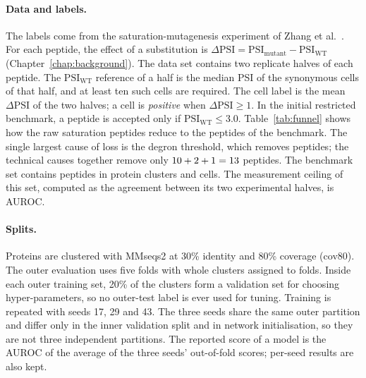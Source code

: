 \paragraph{Data and labels.}
The labels come from the saturation-mutagenesis experiment of Zhang et al.\ \citep{zhang2023,zhang2023data}.
For each peptide, the effect of a substitution is $\Delta\mathrm{PSI}=\mathrm{PSI}_{\mathrm{mutant}}-\mathrm{PSI}_{\mathrm{WT}}$
(Chapter~\ref{chap:background}). The data set contains two replicate halves of each peptide. The
$\mathrm{PSI}_{\mathrm{WT}}$ reference of a half is the median PSI of the synonymous cells of that half,
and at least ten such cells are required. The cell label is the mean $\Delta\mathrm{PSI}$ of the two halves;
a cell is \emph{positive} when $\Delta\mathrm{PSI}\ge 1$. In the initial restricted benchmark, a peptide is accepted only if
$\mathrm{PSI}_{\mathrm{WT}}\le 3.0$. Table~\ref{tab:funnel} shows how the \nNRaw{} raw saturation peptides reduce to
the \nNKept{} peptides of the benchmark. The single largest cause of loss is the degron threshold, which
removes \nNDropDegron{} peptides; the technical causes together remove only
$10+2+1=13$ peptides. The benchmark set contains \nNPep{} peptides in \nNClu{}
protein clusters and \nNCells{} cells. The measurement ceiling of this set, computed as the agreement between
its two experimental halves, is \nCeilingSat{} AUROC.

\begin{table}[htbp]
  \centering
  \caption{Fate of the raw saturation peptides under the label filters}\label{tab:funnel}
  
\end{table}

\paragraph{Splits.}
Proteins are clustered with MMseqs2 \citep{steinegger2017} at 30\% identity and 80\% coverage (cov80). The
outer evaluation uses five folds with whole clusters assigned to folds. Inside each outer training set, 20\%
of the clusters form a validation set for choosing hyper-parameters, so no outer-test label is ever used for
tuning. Training is repeated with seeds 17, 29 and 43. The three seeds share the same outer partition and
differ only in the inner validation split and in network initialisation, so they are not three independent
partitions. The reported score of a model is the AUROC of the average of the three seeds' out-of-fold
scores; per-seed results are also kept.

